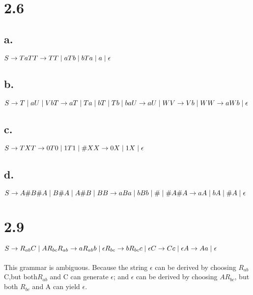 \documentclass{scrartcl}
\begin{document}
\section*{2.6}
\subsection*{a.}
$S\rightarrow TaT\\
T\rightarrow TT\mid aTb\mid bTa\mid a\mid \epsilon$
\subsection*{b.}
$S\rightarrow T\mid aU \mid Vb\\
T\rightarrow aT\mid Ta \mid bT \mid Tb\mid ba\\
U\rightarrow aU \mid W\\
V\rightarrow Vb \mid W\\
W\rightarrow aWb\mid \epsilon
$

\subsection*{c.}
$ S\rightarrow TX\\
T\rightarrow 0T0\mid 1T1 \mid \# X\\
X\rightarrow 0X \mid 1X \mid \epsilon $

\subsection*{d.}
$ S\rightarrow A\# B \# A \mid B \# A \mid A \# B \mid B\\
B\rightarrow aBa \mid bBb \mid \# \mid \# A \# \\
A\rightarrow aA \mid bA \mid \#A \mid \epsilon$


\section*{2.9}
$S\rightarrow R_{ab}C \mid AR_{bc}\\
R_{ab}\rightarrow aR_{ab}b \mid \epsilon\\
R_{bc}\rightarrow bR_{bc}c \mid \epsilon\\
C\rightarrow Cc \mid \epsilon\\
A\rightarrow Aa \mid \epsilon$\\ \\
This grammar is ambiguous. Because the string $\epsilon$ can be derived by choosing $R_{ab}$C,but both$ R_{ab}$ and C can generate $\epsilon$; and $\epsilon$ can be derived by choosing $AR_{bc}$, but both $R_{bc}$ and A can yield $\epsilon$.
\end{document}
